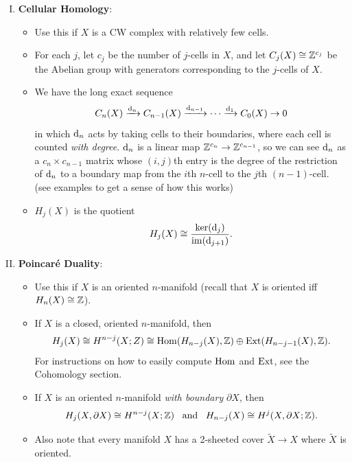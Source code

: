 \documentclass{amsart}
\begin{document}
\begin{enumerate}[(I)]
		\item \textbf{Cellular Homology}: 
		\begin{itemize}
			\item Use this if $X$ is a CW complex with relatively few cells.
			\item For each $j$, let $c_j$ be the number of $j$-cells in $X$, and let $C_j(X)\cong \mathbb{Z}^{c_j}$ be the Abelian group with generators corresponding to the $j$-cells of $X$.
			\item We have the long exact sequence
			$$
			C_n(X) \xrightarrow{\textrm{d}_n} C_{n-1}(X) \xrightarrow{\textrm{d}_{n-1}}\cdots \xrightarrow{\textrm{d}_1} C_0(X) \to 0
			$$
			in which $\textrm{d}_n$ acts by taking cells to their boundaries, where each cell is counted \textit{with degree}. $\textrm{d}_n$ is a linear map $\mathbb{Z}^{c_n}\to \mathbb{Z}^{c_{n-1}}$, so we can see $\textrm{d}_n$ as a $c_n\times c_{n-1}$ matrix whose $(i,j)$th entry is the degree of the restriction of $\textrm{d}_n$ to a boundary map from the $i$th $n$-cell to the $j$th $(n-1)$-cell. (see examples to get a sense of how this works)
			\item $H_j(X)$ is the quotient
			$$
			H_j(X) \cong \frac{\ker(\textrm{d}_j)}{\operatorname{im}(\textrm{d}_{j+1})}.
			$$
		\end{itemize}
		\item \textbf{Poincar\'e Duality}:
		\begin{itemize}
			\item Use this if $X$ is an oriented $n$-manifold (recall that $X$ is oriented iff $H_n(X)\cong \mathbb{Z}$).
			\item If $X$ is a closed, oriented $n$-manifold, then 
			$$
			H_j(X) \cong H^{n-j}(X;Z) \cong \operatorname{Hom}(H_{n-j}(X),\mathbb{Z}) \oplus \operatorname{Ext}(H_{n-j-1}(X),\mathbb{Z}).
			$$
			For instructions on how to easily compute $\operatorname{Hom}$ and $\operatorname{Ext}$, see the Cohomology section.
			\item If $X$ is an oriented $n$-manifold \textit{with boundary} $\partial X$, then 
			$$
			H_j(X,\partial X) \cong H^{n-j}(X;\mathbb{Z}) \;\;\; \text{and} \;\;\; H_{n-j}(X) \cong H^j(X,\partial X;\mathbb{Z}).
			$$
			\item Also note that every manifold $X$ has a 2-sheeted cover $\tilde{X}\to X$ where $\tilde{X}$ is oriented. \\
		\end{itemize}
	\end{enumerate}
	
\end{document}
